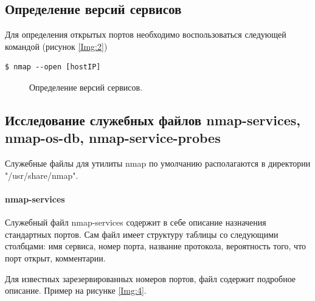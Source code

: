 \documentclass[10pt,a4paper]{report}
\begin{document}
\subsection{Определение версий сервисов}

Для определения открытых портов необходимо воспользоваться следующей командой (рисунок \ref{Img:2})
\begin{verbatim}
$ nmap --open [hostIP]
\end{verbatim}

\begin{figure}[h!]	
	\caption{Определение версий сервисов.}
	\label{Img:3}
\end{figure}

\subsection{Исследование служебных файлов nmap-services, nmap-os-db, nmap-service-probes}

Служебные файлы для утилиты nmap по умолчанию располагаются в директории "/usr/share/nmap".

\paragraph{nmap-services\\}

Служебный файл nmap-services содержит в себе описание назначения стандартных портов. Сам файл имеет структуру таблицы со следующими столбцами: имя сервиса, номер порта, название протокола, вероятность того, что порт открыт, комментарии.

Для известных зарезервированных номеров портов, файл содержит подробное описание. Пример на рисунке \ref{Img:4}.
\end{document}
